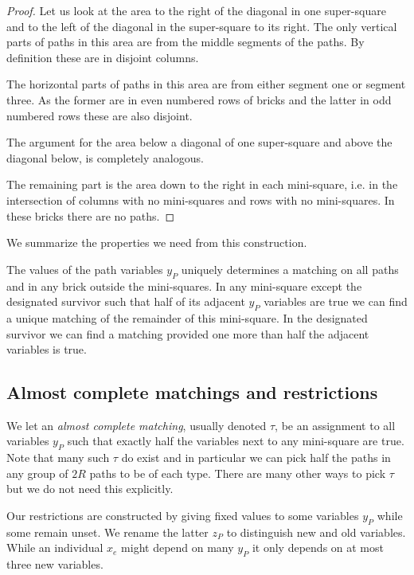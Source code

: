 \documentclass{article}\usepackage[a4paper,margin=20mm]{geometry}
\begin{document}
\begin{proof}
Let us look at the area to the right of the diagonal in one
super-square and to the left of the diagonal in the super-square
to its right.  The only vertical parts of paths in this area
are from the middle segments of the paths.  By definition
these are in disjoint columns.

The horizontal parts of paths in this area  are from either segment one
or segment three.  As the former are in even numbered rows
of bricks and the latter in odd numbered rows these
are also disjoint.

The argument for the area below a diagonal of one super-square and above
the diagonal below, is completely analogous.

The remaining part is the area down to the right in each mini-square, i.e.
in the intersection of columns with no mini-squares and 
rows with no mini-squares.
In these bricks there are no paths.
\end{proof}

We summarize the properties we need from
this construction.  

\begin{lemma}\label{lemma:newmatching}
The values of the path variables $y_P$ uniquely determines
a matching on all paths and in any brick outside
the mini-squares.  In any mini-square except
the designated survivor such that half of its adjacent
$y_P$ variables are true we can find a unique matching
of the remainder of this mini-square.
In the designated survivor we can find a matching
provided one more than half the adjacent
variables is true.
\end{lemma}

\subsection{Almost complete matchings and restrictions}

We let an {\em almost complete matching}, usually denoted $\tau$,
be an assignment to all variables $y_P$ such that exactly half the
variables next to any mini-square are true.  Note that many such
$\tau$ do exist and in particular we can pick half the paths
in any group of $2R$ paths to be of each type.
There are many other ways to pick $\tau$ but we
do not need this explicitly.

Our restrictions are constructed by giving
fixed values to some variables $y_P$ while
some remain unset.  We rename the latter $z_P$ to distinguish
new and old variables.  While an individual $x_e$ might depend on
many $y_P$ it only depends on at most three new variables.
\end{document}

